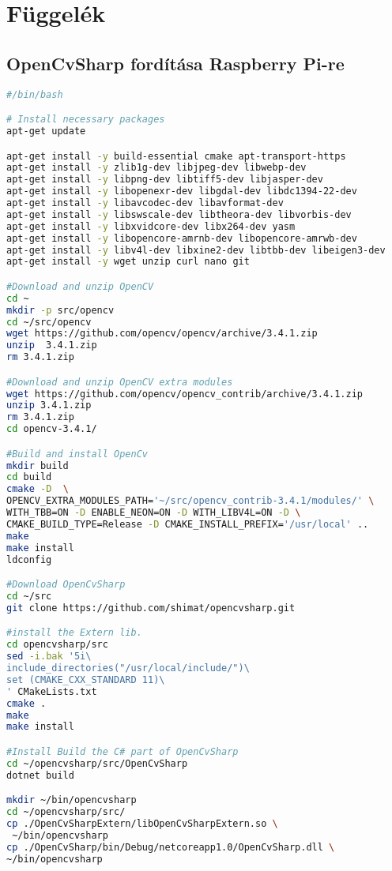 \appendix

\chapter*{Függelék}

\setcounter{chapter}{6}     %

\newpage


\section{OpenCvSharp fordítása Raspberry Pi-re} \label{rpi-build-script}
\begin{scriptsize}
\begin{lstlisting}[language=bash]
#/bin/bash

# Install necessary packages
apt-get update

apt-get install -y build-essential cmake apt-transport-https
apt-get install -y zlib1g-dev libjpeg-dev libwebp-dev 
apt-get install -y libpng-dev libtiff5-dev libjasper-dev  
apt-get install -y libopenexr-dev libgdal-dev libdc1394-22-dev
apt-get install -y libavcodec-dev libavformat-dev
apt-get install -y libswscale-dev libtheora-dev libvorbis-dev 
apt-get install -y libxvidcore-dev libx264-dev yasm
apt-get install -y libopencore-amrnb-dev libopencore-amrwb-dev
apt-get install -y libv4l-dev libxine2-dev libtbb-dev libeigen3-dev
apt-get install -y wget unzip curl nano git

#Download and unzip OpenCV
cd ~
mkdir -p src/opencv
cd ~/src/opencv
wget https://github.com/opencv/opencv/archive/3.4.1.zip
unzip  3.4.1.zip
rm 3.4.1.zip

#Download and unzip OpenCV extra modules
wget https://github.com/opencv/opencv_contrib/archive/3.4.1.zip
unzip 3.4.1.zip
rm 3.4.1.zip
cd opencv-3.4.1/

#Build and install OpenCv
mkdir build
cd build
cmake -D  \
OPENCV_EXTRA_MODULES_PATH='~/src/opencv_contrib-3.4.1/modules/' \
WITH_TBB=ON -D ENABLE_NEON=ON -D WITH_LIBV4L=ON -D \
CMAKE_BUILD_TYPE=Release -D CMAKE_INSTALL_PREFIX='/usr/local' ..
make
make install
ldconfig

#Download OpenCvSharp
cd ~/src
git clone https://github.com/shimat/opencvsharp.git

#install the Extern lib.
cd opencvsharp/src
sed -i.bak '5i\
include_directories("/usr/local/include/")\
set (CMAKE_CXX_STANDARD 11)\
' CMakeLists.txt
cmake .
make
make install

#Install Build the C# part of OpenCvSharp
cd ~/opencvsharp/src/OpenCvSharp
dotnet build

mkdir ~/bin/opencvsharp
cd ~/opencvsharp/src/
cp ./OpenCvSharpExtern/libOpenCvSharpExtern.so \
 ~/bin/opencvsharp
cp ./OpenCvSharp/bin/Debug/netcoreapp1.0/OpenCvSharp.dll \
~/bin/opencvsharp
\end{lstlisting}
\end{scriptsize}

